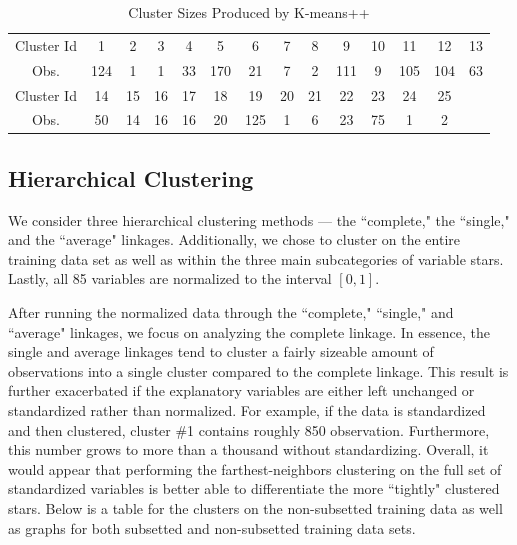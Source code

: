 \documentclass[12pt]{article}
\begin{document}
\begin{table}[h]
\center
\caption{Cluster Sizes Produced by K-means++ }
\begin{tabular}{c c c c c c c c c c c c c c}
\hline
Cluster Id & 1  & 2 & 3 & 4  & 5   & 6  & 7 & 8 & 9   & 10 & 11  & 12  & 13 \\
Obs. 	   &124 & 1 & 1 & 33 & 170 & 21 & 7 & 2 & 111 & 9  & 105 & 104 & 63\\
\hline
Cluster Id & 14 & 15  & 16 & 17 & 18 & 19 & 20 & 21 & 22 & 23 & 24 & 25 & \\
Obs.       & 50 & 14 & 16 & 16  & 20 & 125 & 1  & 6  & 23  & 75  & 1  & 2  &\\
\hline
\end{tabular}
\end{table}


\subsection{Hierarchical Clustering}
We consider three hierarchical clustering methods --- the ``complete," the ``single," and the ``average" linkages. Additionally, we chose to cluster on the entire training data set as well as within the three main subcategories of variable stars. Lastly, all 85 variables are normalized to the interval $[0,1]$. 

After running the normalized data through the ``complete," ``single," and ``average" linkages, we focus on analyzing the complete linkage. In essence, the single and average linkages tend to cluster a fairly sizeable amount of observations into a single cluster compared to the complete linkage. This result is further exacerbated if the explanatory variables are either left unchanged or standardized rather than normalized. For example, if the data is standardized and then clustered, cluster \#1 contains roughly 850 observation. Furthermore, this number grows to more than a thousand without standardizing. Overall, it would appear that performing the farthest-neighbors clustering on the full set of standardized variables is better able to differentiate the more ``tightly" clustered stars. Below is a table for the clusters on the non-subsetted training data as well as graphs for both subsetted and non-subsetted training data sets.
\end{document}
